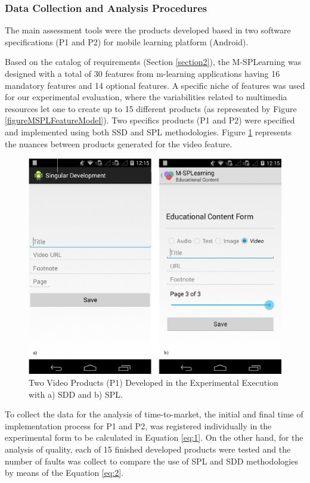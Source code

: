 \subsubsection{Data Collection and Analysis Procedures}

The main assessment tools were the products developed based in two software specifications (P1 and P2) for mobile learning platform (Android).

Based on the catalog of requirements (Section \ref{section2}), the M-SPLearning was designed with a total of 30 features from m-learning applications having 16 mandatory features and 14 optional features. A specific niche of features was used for our experimental evaluation, where the variabilities related to multimedia resources let one to create up to 15 different products (as represented by Figure \ref{figureMSPLFeatureModel}). Two specifics products (P1 and P2) were specified and implemented using both SSD and SPL methodologies. Figure \ref{fig:prod} represents the nuances between products generated for the video feature.


\begin{figure}[t]
\centering
\includegraphics[scale=0.2]{figures/section4/prod.eps}
\centering
\caption{Two Video Products (P1) Developed in the Experimental Execution with a) SDD and b) SPL.}
\label{fig:prod}
\end{figure}


To collect the data for the analysis of time-to-market, the initial and final time of implementation process for P1 and P2, was registered individually in the experimental form to be calculated in Equation \ref{eq:1}. On the other hand, for the analysis of quality, each of 15 finished developed products were tested and the number of faults was collect to compare the use of SPL and SDD methodologies by means of the Equation \ref{eq:2}.

